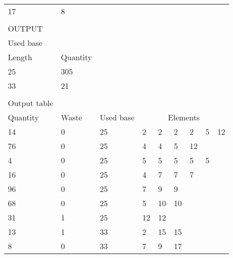 \begin{longtable}{lllllllll}
17                       & 8            &           &                  &    &    &    &   &    \\
                         &              &           &                  &    &    &    &   &    \\
OUTPUT                   &              &           &                  &    &    &    &   &    \\
Used base         &              &           &                  &    &    &    &   &    \\
Length                   & Quantity     &           &                  &    &    &    &   &    \\
25                       & 305          &           &                  &    &    &    &   &    \\
33                       & 21           &           &                  &    &    &    &   &    \\
                         &              &           &                  &    &    &    &   &    \\
Output table             &              &           &                  &    &    &    &   &    \\
Quantity                 & Waste        & Used base & \multicolumn{6}{c}{Elements}    \\
14                       & 0            & 25        & 2                & 2  & 2  & 2  & 5 & 12 \\
76                       & 0            & 25        & 4                & 4  & 5  & 12 &   &    \\
4                        & 0            & 25        & 5                & 5  & 5  & 5  & 5 &    \\
16                       & 0            & 25        & 4                & 7  & 7  & 7  &   &    \\
96                       & 0            & 25        & 7                & 9  & 9  &    &   &    \\
68                       & 0            & 25        & 5                & 10 & 10 &    &   &    \\
31                       & 1            & 25        & 12               & 12 &    &    &   &    \\
13                       & 1            & 33        & 2                & 15 & 15 &    &   &    \\
8                        & 0            & 33        & 7                & 9  & 17 &    &   &    \\

\end{longtable}
